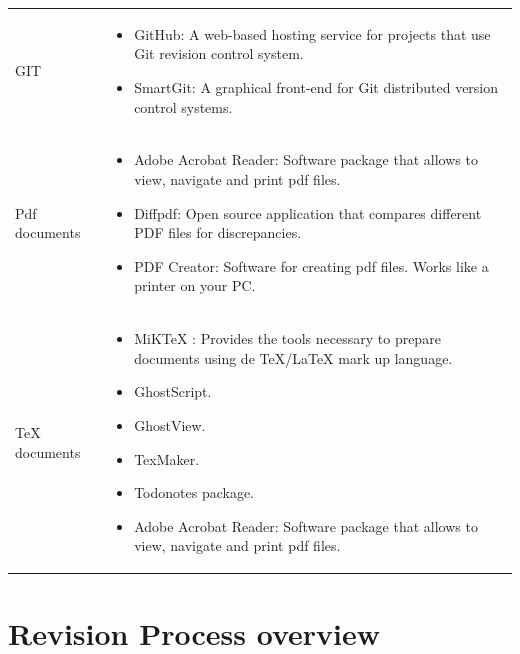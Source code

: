 \documentclass{template/openetcs_article}
\begin{document}
\begin{flushleft}

\begin{tabular}{|m{3cm}|m{11cm}|}
\hline
\rowcolor{myblue}
\multicolumn{2}{|c|}{Tools} \\\hline
GIT &
\begin{itemize}
\item GitHub: A web-based hosting service for projects that use Git revision control system.
\item SmartGit: A graphical front-end for Git distributed version control systems. 
\end{itemize}\\\hline
Pdf documents &
\begin{itemize}
\item Adobe Acrobat Reader: Software package that allows to view, navigate and print pdf files.
\item Diffpdf: Open source application that compares different PDF files for discrepancies. 
\item {PDF Creator: Software for creating pdf files. Works like a printer on your PC.}
\end{itemize}\\\hline
TeX documents &
\begin{itemize}
\item MiKTeX : Provides the tools necessary to prepare documents using de TeX/LaTeX mark up language.
\item GhostScript. 
\item GhostView.
\item TexMaker.
\item Todonotes package.
\item Adobe Acrobat Reader: Software package that allows to view, navigate and print pdf files.
\end{itemize}\\\hline
\end{tabular}
\end{flushleft}

\section{Revision Process overview}
\end{document}
